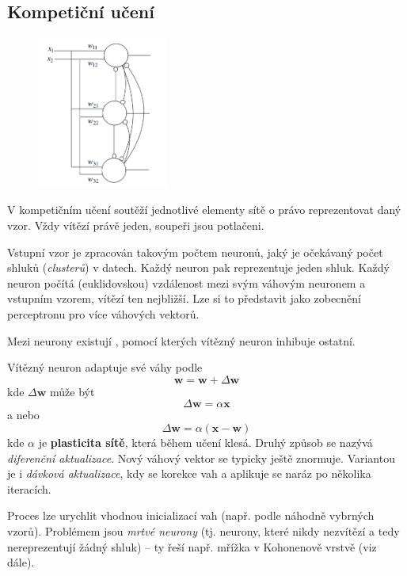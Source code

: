 \documentclass[11pt]{report} %
\renewcommand{\vec}[1]{\mathbf{#1}}
\numberwithin{equation}{section}
\begin{document}
\subsection{Kompetiční učení}
\begin{figure}
	\includegraphics[width=0.38\textwidth]{img/nn_competitive.png}
\end{figure}
V kompetičním učení soutěží jednotlivé elementy sítě o právo reprezentovat daný vzor. Vždy vítězí právě jeden, soupeři jsou potlačeni.

Vstupní vzor je zpracován takovým počtem neuronů, jaký je očekávaný počet shluků (\textit{clusterů}) v datech. Každý neuron pak reprezentuje jeden shluk. Každý neuron počítá (euklidovskou) vzdálenost mezi svým váhovým neuronem a vstupním vzorem, vítězí ten nejbližší. Lze si to představit jako zobecnění perceptronu pro více váhových vektorů.

Mezi neurony existují , pomocí kterých vítězný neuron inhibuje ostatní. 

Vítězný neuron adaptuje své váhy podle
$$\vec{w} = \vec{w} + \Delta \vec{w}$$
kde $\Delta \vec{w}$ může být
$$\Delta \vec{w} = \alpha\vec{x}$$
a nebo
$$\Delta \vec{w} = \alpha(\vec{x} - \vec{w})$$
kde $\alpha$ je \textbf{plasticita sítě}, která během učení klesá. Druhý způsob se nazývá \textit{diferenční aktualizace}. Nový váhový vektor se typicky ještě znormuje. Variantou je i \textit{dávková aktualizace}, kdy se korekce vah  a aplikuje se naráz po několika iteracích.

Proces lze urychlit vhodnou inicializací vah (např. podle náhodně vybrných vzorů). Problémem jsou \textit{mrtvé neurony} (tj. neurony, které nikdy nezvítězí a tedy nereprezentují žádný shluk) -- ty řeší např. mřížka v Kohonenově vrstvě (viz dále).
\end{document}
